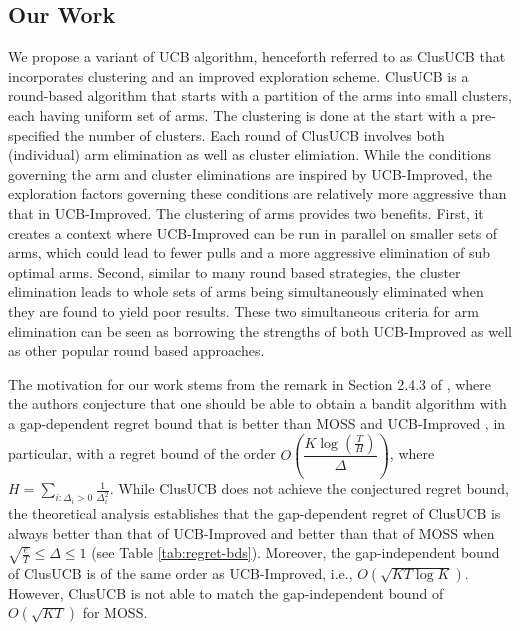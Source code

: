 \subsection*{Our Work}
We propose a variant of UCB algorithm, henceforth referred to as ClusUCB that incorporates clustering and an improved exploration scheme. ClusUCB is a round-based algorithm that
starts with a partition of the arms into small clusters, each having uniform set of arms. 
The clustering is done at the start with a pre-specified the number of clusters. 
Each round of ClusUCB involves both (individual) arm elimination as well as cluster elimiation. While the conditions governing the arm and cluster eliminations are inspired by UCB-Improved, the exploration factors governing these conditions are relatively more aggressive than that in UCB-Improved. The clustering of arms provides two benefits. First, it creates a context where UCB-Improved can be run in parallel on smaller sets of arms, which could lead to fewer pulls and a more aggressive elimination of sub optimal arms. Second, similar to many round based strategies, the cluster elimination leads to whole sets of arms being simultaneously eliminated when they are found to yield poor results. These two simultaneous criteria for arm elimination can be seen as borrowing the strengths of both UCB-Improved as well as other popular round based approaches.

The motivation for our work stems from the remark in Section 2.4.3 of \cite{bubeck2012bandits}, where the authors conjecture that one should be able to obtain a bandit algorithm with a
gap-dependent regret bound that is better than MOSS \cite{audibert2009minimax} and UCB-Improved \cite{auer2010ucb}, in particular, with a regret bound of the order 
$O\left(\dfrac{K\log (\frac{T}{H})}{\Delta}\right)$, where $H = \sum_{i:\Delta_i>0} \frac{1}{\Delta_i^2}$. While ClusUCB does not achieve the conjectured regret bound, 
the theoretical analysis establishes
that the gap-dependent regret of ClusUCB is always better than that of UCB-Improved and better than that of MOSS when $\sqrt{\frac{e}{T}} \leq \Delta\leq 1$ (see Table \ref{tab:regret-bds}). Moreover, the gap-independent bound of ClusUCB is of the same order as UCB-Improved, i.e., $O\left(\sqrt{KT\log K}\right)$. However, ClusUCB is not able to match the gap-independent bound of $O(\sqrt{KT})$ for MOSS.




